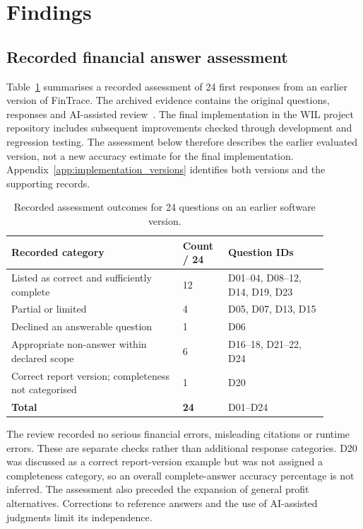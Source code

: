 \section{Findings}
\label{sec:Findings}

\subsection{Recorded financial answer assessment}
Table~\ref{tab:evaluation_checkpoints} summarises a recorded assessment of 24 first responses from an earlier version of FinTrace. The archived evidence contains the original questions, responses and AI-assisted review~\cite{fintraceReleaseReview2026}. The final implementation in the WIL project repository includes subsequent improvements checked through development and regression testing. The assessment below therefore describes the earlier evaluated version, not a new accuracy estimate for the final implementation. Appendix~\ref{app:implementation_versions} identifies both versions and the supporting records.

\begin{table}[htbp]
\centering
\small
\caption{Recorded assessment outcomes for 24 questions on an earlier software version.}
\label{tab:evaluation_checkpoints}
\renewcommand{\arraystretch}{1.15}
\begin{tabular}{p{0.48\linewidth}p{0.12\linewidth}p{0.29\linewidth}}
\hline
\raggedright\textbf{Recorded category} & \raggedright\textbf{Count / 24} & \raggedright\textbf{Question IDs} \tabularnewline
\hline
\raggedright Listed as correct and sufficiently complete & 12 & \raggedright D01--04, D08--12, D14, D19, D23 \tabularnewline
\raggedright Partial or limited & 4 & \raggedright D05, D07, D13, D15 \tabularnewline
\raggedright Declined an answerable question & 1 & D06 \tabularnewline
\raggedright Appropriate non-answer within declared scope & 6 & \raggedright D16--18, D21--22, D24 \tabularnewline
\raggedright Correct report version; completeness not categorised & 1 & D20 \tabularnewline
\hline
\textbf{Total} & \textbf{24} & D01--D24 \tabularnewline
\hline
\end{tabular}
\end{table}

The review recorded no serious financial errors, misleading citations or runtime errors. These are separate checks rather than additional response categories. D20 was discussed as a correct report-version example but was not assigned a completeness category, so an overall complete-answer accuracy percentage is not inferred. The assessment also preceded the expansion of general profit alternatives. Corrections to reference answers and the use of AI-assisted judgments limit its independence.

